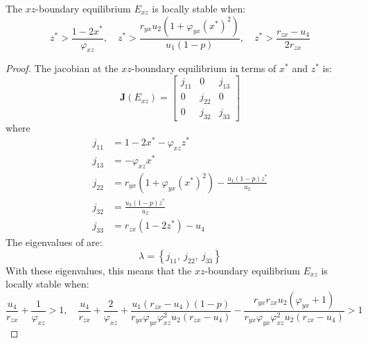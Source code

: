\begin{theorem}\label{thm:boundary-xz-stability}
    The $xz$-boundary equilibrium $E_{xz}$ is locally stable when:
    \begin{equation*}
        z^*>\frac{1-2x^*}{\varphi_{xz}},\quad
        z^*>\frac{r_{yx}u_2\left(1+\varphi_{yx}\left(x^*\right)^2\right)}{u_1\left(1-p\right)},\quad
        z^*>\frac{r_{zx}-u_4}{2r_{zx}}
    \end{equation*}
\end{theorem}
\begin{proof}
    The jacobian at the $xz$-boundary equilibrium in terms of $x^*$ and $z^*$ is:
    \begin{equation}\label{matrix:jacobian-boundary-xz}
        \textbf{J}\left(E_{xz}\right) = \begin{bmatrix}
            j_{11} & 0 & j_{13}\\
            0 & j_{22} & 0\\
            0 & j_{32} & j_{33}
        \end{bmatrix}
    \end{equation}
    where
    \begin{align*}
        j_{11} &= 1-2x^*-\varphi_{xz}z^*\\
        j_{13} &= -\varphi_{xz}x^*\\
        j_{22} &= r_{yx}\left(1+\varphi_{yx}\left(x^*\right)^2\right)-\frac{u_1\left(1-p\right)z^*}{u_2}\\
        j_{32} &= \frac{u_3\left(1-p\right)z^*}{u_2}\\
        j_{33} &= r_{zx}\left(1-2z^*\right)-u_4
    \end{align*}
    The eigenvalues of  are:
    \begin{equation*}
        \lambda=\left\{j_{11},\ j_{22},\ j_{33}\right\}
    \end{equation*}
    With these eigenvalues, this means that the $xz$-boundary equilibrium $E_{xz}$ is locally stable when:
    \begin{equation*}
        \frac{u_4}{r_{zx}}+\frac{1}{\varphi_{xz}} > 1,\quad
        \frac{u_4}{r_{zx}}+\frac{2}{\varphi_{xz}}+\frac{u_1\left(r_{zx}-u_4\right)\left(1-p\right)}{r_{yx}\varphi_{yx}\varphi_{xz}^2u_2\left(r_{zx}-u_4\right)}-\frac{r_{yx}r_{zx}u_2\left(\varphi_{yx}+1\right)}{r_{yx}\varphi_{yx}\varphi_{xz}^2u_2\left(r_{zx}-u_4\right)} > 1
    \end{equation*}
\end{proof}

